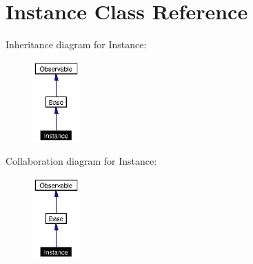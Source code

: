 \section{Instance Class Reference}
\label{classInstance}
Inheritance diagram for Instance:\begin{figure}[H]
\begin{center}
\leavevmode
\includegraphics[width=50pt]{classInstance__inherit__graph}
\end{center}
\end{figure}
Collaboration diagram for Instance:\begin{figure}[H]
\begin{center}
\leavevmode
\includegraphics[width=50pt]{classInstance__coll__graph}
\end{center}
\end{figure}
